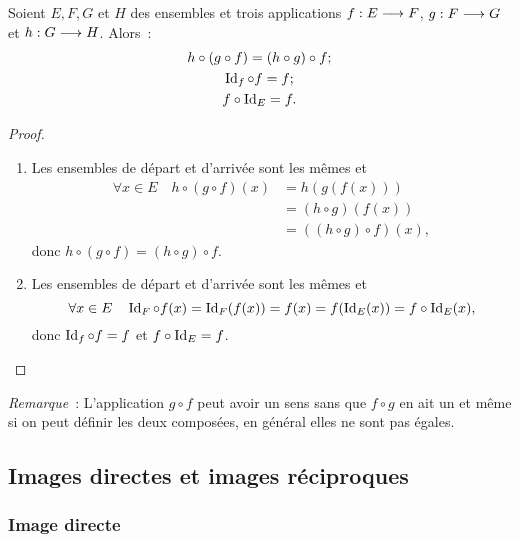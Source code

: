 \begin{prop}
  Soient \(E, F, G\) et \(H\) des ensembles et trois applications 
  \(f:E \longrightarrow{} F\), \(g:F \longrightarrow{} G\) et \(h:G \longrightarrow{} H\). 
  Alors~:
  \begin{gather}
    h \circ (g \circ f) = (h \circ g) \circ f;\\
    \operatorname{Id}_f \circ f = f;\\
    f \circ \operatorname{Id}_E = f.
  \end{gather}
\end{prop}

\begin{proof}
  \begin{enumerate}
    \item Les ensembles de départ et d'arrivée sont les mêmes et 
      \begin{align*}
        \forall x \in E \quad h \circ (g \circ f)(x) & = h(g(f(x))) \\
                                                     & = (h \circ g)(f(x))\\
                                                     & = ((h \circ g) \circ f)(x),
      \end{align*}
      donc \(h \circ (g \circ f) = (h \circ g) \circ f\).
    \item Les ensembles de départ et d'arrivée sont les mêmes et 
      \begin{equation*}
        \forall x \in E \quad \operatorname{Id}_F \circ 
        f(x) = \operatorname{Id}_F(f(x)) = f(x) = f(\operatorname{Id}_E(x)) = f \circ \operatorname{Id}_E(x),
      \end{equation*}
      donc \(\operatorname{Id}_f \circ f = f\) et \(f \circ \operatorname{Id}_E = f\).
  \end{enumerate}
\end{proof}

\emph{Remarque}~: L'application \(g \circ f\) peut avoir un sens sans que \(f 
\circ g\) en ait un et même si on peut définir les deux composées, en général 
elles ne sont pas égales.

\subsection{Images directes et images réciproques}
\label{chap3-subsec:imagesdirecteetrec}

\subsubsection{Image directe}
\label{chap3-subsec:imagedirecte}

